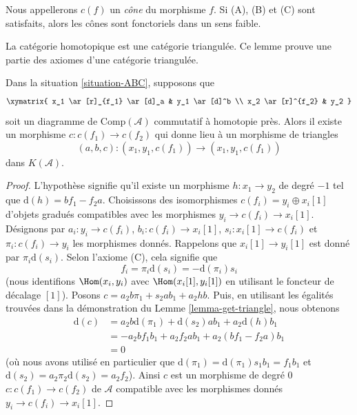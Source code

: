 \noindent
Nous appellerons $c(f)$ un {\it cône} du morphisme $f$. Si (A), (B) et (C)
sont satisfaits, alors les cônes sont fonctoriels dans un sens faible.

\begin{lemma}
\label{lemma-cone}
\begin{slogan}
La catégorie homotopique est une catégorie triangulée. Ce lemme prouve une partie
des axiomes d'une catégorie triangulée.
\end{slogan}
Dans la situation \ref{situation-ABC}, supposons que
$$
\xymatrix{
x_1 \ar[r]_{f_1} \ar[d]_a & y_1 \ar[d]^b \\
x_2 \ar[r]^{f_2} & y_2
}
$$
soit un diagramme de $\text{Comp}(\mathcal{A})$ commutatif à homotopie près. Alors
il existe un morphisme $c : c(f_1) \to c(f_2)$ qui donne lieu à un morphisme de
triangles
$$
(a, b, c) : (x_1, y_1, c(f_1)) \to (x_1, y_1, c(f_1))
$$
dans $K(\mathcal{A})$.
\end{lemma}

\begin{proof}
L'hypothèse signifie qu'il existe un morphisme $h : x_1 \to y_2$ de degré $-1$ tel
que $\text{d}(h) = b f_1 - f_2 a$. Choisissons des isomorphismes $c(f_i) = y_i
\oplus x_i[1]$ d'objets gradués compatibles avec les morphismes $y_i \to c(f_i)
\to x_i[1]$. Désignons par $a_i : y_i \to c(f_i)$, $b_i : c(f_i) \to x_i[1]$, $s_i :
x_i[1] \to c(f_i)$ et $\pi_i : c(f_i) \to y_i$ les morphismes donnés. Rappelons
que $x_i[1] \to y_i[1]$ est donné par $\pi_i \text{d}(s_i)$. Selon l'axiome (C),
cela signifie que
$$
f_i = \pi_i \text{d}(s_i) = - \text{d}(\pi_i) s_i
$$
(nous identifions $\Hom(x_i, y_i)$ avec $\Hom(x_i[1], y_i[1])$ en utilisant le
foncteur de décalage $[1]$). Posons $c = a_2 b \pi_1 + s_2 a b_1 + a_2hb$. Puis,
en utilisant les égalités trouvées dans la démonstration du Lemme
\ref{lemma-get-triangle}, nous obtenons
\begin{align*}
\text{d}(c)
& =
a_2 b \text{d}(\pi_1) + \text{d}(s_2) a b_1 + a_2 \text{d}(h) b_1 \\
& =
- a_2 b f_1 b_1 + a_2 f_2 a b_1 + a_2 (b f_1 - f_2 a) b_1 \\
& = 0
\end{align*}
(où nous avons utilisé en particulier que $\text{d}(\pi_1) = \text{d}(\pi_1) s_1
b_1 = f_1 b_1$ et $\text{d}(s_2) = a_2 \pi_2 \text{d}(s_2) = a_2 f_2$). Ainsi $c$
est un morphisme de degré $0$ $c : c(f_1) \to c(f_2)$ de $\mathcal{A}$ compatible
avec les morphismes donnés $y_i \to c(f_i) \to x_i[1]$.
\end{proof}

